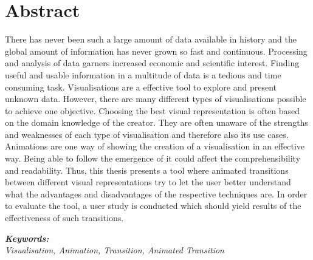 \section*{Abstract}
\vspace{0.5cm}

There has never been such a large amount of data available in history and the global amount of information has never grown so fast and continuous. Processing and analysis of data garners increased economic and scientific interest. Finding useful and usable information in a multitude of data is a tedious and time consuming task. Visualisations are a effective tool to explore and present unknown data. However, there are many different types of visualisations possible to achieve one objective. Choosing the best visual representation is often based on the domain knowledge of the creator. They are often unaware of the strengths and weaknesses of each type of visualisation and therefore also its use cases. Animations are one way of showing the creation of a visualisation in an effective way. Being able to follow the emergence of it could affect the comprehensibility and readability. Thus, this thesis presents a tool where animated transitions between different visual representations try to let the user better understand what the advantages and disadvantages of the respective techniques are. In order to evaluate the tool, a user study is conducted which should yield results of the effectiveness of such transitions.

\vspace{0.5cm}
\textbf{\textit{Keywords:}} \\
\textit{Visualisation, Animation, Transition, Animated Transition}